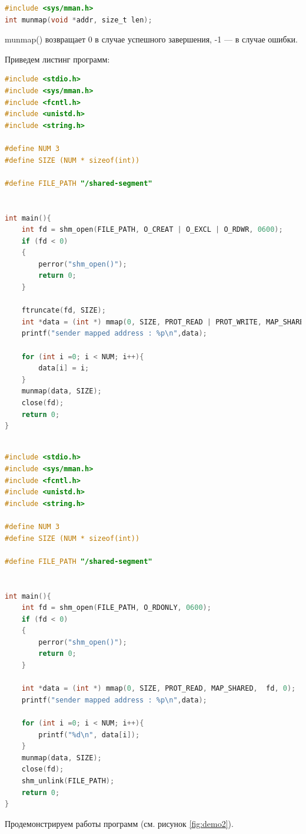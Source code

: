 \documentclass[a4paper,14pt]{extarticle}
\begin{document}
\begin{lstlisting}[language=C]
#include <sys/mman.h>
int munmap(void *addr, size_t len);

\end{lstlisting}
 munmap() возвращает 0 в случае успешного завершения, -1 --- в случае ошибки.
 
 Приведем листинг программ: 
 
\begin{lstlisting}[language=C, caption={memwrite.c}, label={lst:memw}]
#include <stdio.h>
#include <sys/mman.h>
#include <fcntl.h>
#include <unistd.h>
#include <string.h>

#define NUM 3
#define SIZE (NUM * sizeof(int))

#define FILE_PATH "/shared-segment"


int main(){
	int fd = shm_open(FILE_PATH, O_CREAT | O_EXCL | O_RDWR, 0600);
	if (fd < 0)
	{
		perror("shm_open()");
		return 0;
	}
	
	ftruncate(fd, SIZE);
	int *data = (int *) mmap(0, SIZE, PROT_READ | PROT_WRITE, MAP_SHARED,  fd, 0);
	printf("sender mapped address : %p\n",data);
	
	for (int i =0; i < NUM; i++){
		data[i] = i;
	}
	munmap(data, SIZE);
	close(fd);
	return 0;
}
\end{lstlisting}


\begin{lstlisting}[language=C, caption={memread.c}, label={lst:memr}]

#include <stdio.h>
#include <sys/mman.h>
#include <fcntl.h>
#include <unistd.h>
#include <string.h>

#define NUM 3
#define SIZE (NUM * sizeof(int))

#define FILE_PATH "/shared-segment"


int main(){
	int fd = shm_open(FILE_PATH, O_RDONLY, 0600);
	if (fd < 0)
	{
		perror("shm_open()");
		return 0;
	}
	
	int *data = (int *) mmap(0, SIZE, PROT_READ, MAP_SHARED,  fd, 0);
	printf("sender mapped address : %p\n",data);
	
	for (int i =0; i < NUM; i++){
		printf("%d\n", data[i]);
	}
	munmap(data, SIZE);
	close(fd);
	shm_unlink(FILE_PATH);
	return 0;
}
 \end{lstlisting}
 
 Продемонстрируем работы программ (см. рисунок \ref{fig:demo2}).
 
\end{document}
